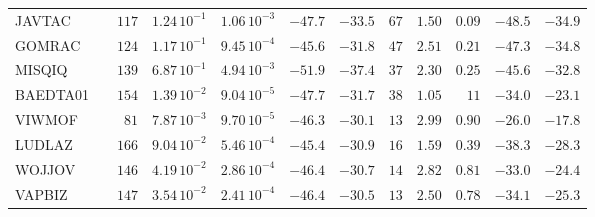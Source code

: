 \documentclass[main.tex]{subfiles}
\begin{document}
\begin{table}[hb]
\begin{tabular}{|lr|rrrrr|rrrrr|}
        JAVTAC & \cite{JAVTAC}        &  $117$  &  $1.24\,10^{-1}$  &  $1.06\,10^{-3}$  &  $-47.7$  &  $-33.5$  &  $ 67$  &  $1.50$  &  $0.09$  &  $-48.5$  &  $-34.9$  \\
        GOMRAC & \cite{GOMREG_GOMRAC} &  $124$  &  $1.17\,10^{-1}$  &  $9.45\,10^{-4}$  &  $-45.6$  &  $-31.8$  &  $ 47$  &  $2.51$  &  $0.21$  &  $-47.3$  &  $-34.8$  \\
        MISQIQ & \cite{MISQIQ}        &  $139$  &  $6.87\,10^{-1}$  &  $4.94\,10^{-3}$  &  $-51.9$  &  $-37.4$  &  $ 37$  &  $2.30$  &  $0.25$  &  $-45.6$  &  $-32.8$  \\
      BAEDTA01 & \cite{BAEDTA01}      &  $154$  &  $1.39\,10^{-2}$  &  $9.04\,10^{-5}$  &  $-47.7$  &  $-31.7$  &  $ 38$  &  $1.05$  &  $  11$  &  $-34.0$  &  $-23.1$  \\
        VIWMOF & \cite{VIWMOF}        &  $ 81$  &  $7.87\,10^{-3}$  &  $9.70\,10^{-5}$  &  $-46.3$  &  $-30.1$  &  $ 13$  &  $2.99$  &  $0.90$  &  $-26.0$  &  $-17.8$  \\
        LUDLAZ & \cite{LUDLAZ}        &  $166$  &  $9.04\,10^{-2}$  &  $5.46\,10^{-4}$  &  $-45.4$  &  $-30.9$  &  $ 16$  &  $1.59$  &  $0.39$  &  $-38.3$  &  $-28.3$  \\
        WOJJOV & \cite{WOJJOV}        &  $146$  &  $4.19\,10^{-2}$  &  $2.86\,10^{-4}$  &  $-46.4$  &  $-30.7$  &  $ 14$  &  $2.82$  &  $0.81$  &  $-33.0$  &  $-24.4$  \\
        VAPBIZ & \cite{VAPBIZ}        &  $147$  &  $3.54\,10^{-2}$  &  $2.41\,10^{-4}$  &  $-46.4$  &  $-30.5$  &  $ 13$  &  $2.50$  &  $0.78$  &  $-34.1$  &  $-25.3$  \\
    \hline
    \end{tabular}
\end{table}
\end{document}
